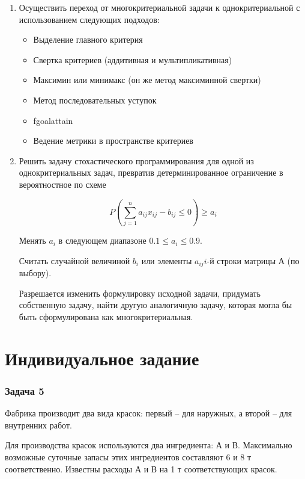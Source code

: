 \documentclass[14pt,a4paper,report]{report}
\begin{document}
\begin{enumerate}
    \item Осуществить переход от многокритериальной задачи к однокритериальной с использованием следующих подходов:
    
\begin{itemize}
 \item Выделение главного критерия
 \item Свертка критериев (аддитивная и мультипликативная)
 \item Максимин или минимакс (он же метод максиминной свертки)
 \item Метод последовательных уступок
 \item fgoalattain
 \item Ведение метрики в пространстве критериев
\end{itemize}

    \item  Решить задачу стохастического программирования для одной из однокритериальных задач, превратив детерминированное ограничение в вероятностное по схеме
   
   $$ P(\sum_{j=1}^n a_{ij}x_{ij} - b_{ij} \leq 0) \geq a_i$$
   
Менять  $ a_i $  в следующем диапазоне $ 0.1 \leq a_i \leq 0.9 $.

Считать случайной величиной $b_i$  или элементы   $ {a_{ij}}i$-й строки матрицы  А  (по выбору).

Разрешается изменить формулировку исходной задачи, придумать собственную задачу, найти другую аналогичную задачу, которая могла бы быть сформулирована как многокритериальная.
\end{enumerate}

\section{Индивидуальное задание}

\subsubsection{Задача 5}



Фабрика производит два вида красок: первый – для наружных, а второй – для внутренних работ. 

Для производства красок используются два ингредиента: А и В. Максимально возможные суточные запасы этих ингредиентов составляют 6 и 8 т соответственно. Известны расходы А и В на 1 т соответствующих красок.
\end{document}
